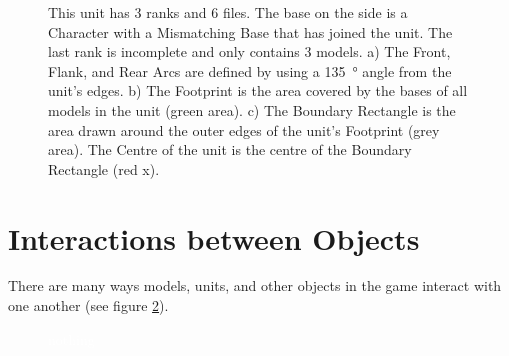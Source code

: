 \newcommand{\frontfacing}{Front Facing}
\newcommand{\leftflankfacing}{%
\begin{minipage}{0.10\unitlength}\begin{center}%
Left Flank Facing%
\end{center}\end{minipage}}
\newcommand{\rightflankfacing}{%
\begin{minipage}{0.10\unitlength}\begin{center}%
Right Flank Facing%
\end{center}\end{minipage}}
\newcommand{\rearfacing}{Rear Facing}
\newcommand{\centreofunit}{Centre of Unit}

\begin{figure}[!htbp]
\centering
\def\svgwidth{\textwidth}

\caption{
This unit has 3 ranks and 6 files. The base on the side is a Character with a Mismatching Base that has joined the unit. The last rank is incomplete and only contains 3 models.\captionpar
a) The Front, Flank, and Rear Arcs are defined by using a \SI{135}{\degree} angle from the unit's edges.\captionpar
b) The Footprint is the area covered by the bases of all models in the unit (green area).\captionpar
c) The Boundary Rectangle is the area drawn around the outer edges of the unit's Footprint (grey area). The Centre of the unit is the centre of the Boundary Rectangle (red x).
}
\label{figure/arcs}
\end{figure}

\section{Interactions between Objects}
\label{interactions_between_objects}

There are many ways models, units, and other objects in the game interact with one another (see figure \ref{figure/contact}).

\newcommand{\CONTACTa}{a)}
\newcommand{\CONTACTb}{b)}
\newcommand{\CONTACTc}{c)}
\newcommand{\CONTACTd}{d)}

\begin{figure}[!htbp]
\def\svgwidth{\textwidth}

\caption{\textcolor{white}{nothing}}
\label{figure/contact}
\end{figure}

